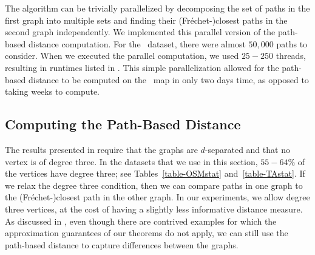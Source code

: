 The algorithm can be trivially parallelized by decomposing the set of paths in
the first graph into
multiple sets and finding their (Fr\'echet-)closest paths in the
second graph independently. We implemented this parallel version of the
path-based distance computation.
For the \blarge\ dataset, there were almost $50,000$ paths to consider.  When
we executed the parallel computation, we used $25-250$ threads, resulting in
runtimes listed in .
This simple
parallelization allowed for the path-based distance to be computed on the
\blarge\ map in only two days time, as opposed to taking weeks to compute.












\subsection{Computing the Path-Based Distance}
\label{subsec-goodVertices}
The results presented in  require that the graphs are
$d$-separated and that no vertex is of degree three. 
In the datasets that
we use in this section, $55-64\%$ of the vertices have degree three; see 
Tables~\ref{table-OSMstat} and~\ref{table-TAstat}.  If we
relax the degree three condition, then we can compare paths in one graph to
the (Fr\'echet-)closest path in the other graph.   In our experiments, we 
allow degree three vertices, at the cost of having a slightly less informative 
distance measure.
As discussed in , even though there are contrived examples for which the approximation guarantees of our
theorems do not apply, we can still use the path-based distance to
capture differences between the graphs. 


